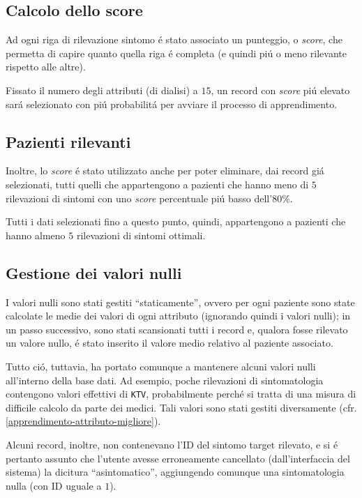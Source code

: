 \documentclass[preprint]{acm_proc_article-sp}
\begin{document}
\subsection{Calcolo dello score}
Ad ogni riga di rilevazione sintomo \'e stato associato un punteggio, o \textit{score}, che permetta di capire quanto quella riga \'e completa (e quindi pi\'u o meno rilevante rispetto alle altre).

Fissato il numero degli attributi (di dialisi) a $15$, un record con \textit{score} pi\'u elevato sar\'a selezionato con pi\'u probabilit\'a per avviare il processo di apprendimento.

\subsection{Pazienti rilevanti}
Inoltre, lo \textit{score} \'e stato utilizzato anche per poter eliminare, dai record gi\'a selezionati, tutti quelli che appartengono a pazienti che hanno meno di $5$ rilevazioni di sintomi con uno \textit{score} percentuale pi\'u basso dell'$80\%$.

Tutti i dati selezionati fino a questo punto, quindi, appartengono a pazienti che hanno almeno $5$ rilevazioni di sintomi ottimali.

\subsection{Gestione dei valori nulli}
I valori nulli sono stati gestiti ``staticamente'', ovvero per ogni paziente sono state calcolate le medie dei valori di ogni attributo (ignorando quindi i valori nulli); in un passo successivo, sono stati scansionati tutti i record e, qualora fosse rilevato un valore nullo, \'e stato inserito il valore medio relativo al paziente associato.

Tutto ci\'o, tuttavia, ha portato comunque a mantenere alcuni valori nulli all'interno della base dati. Ad esempio, poche rilevazioni di sintomatologia contengono valori effettivi di \verb|KTV|, probabilmente perch\'e si tratta di una misura di difficile calcolo da parte dei medici. Tali valori sono stati gestiti diversamente (cfr. \ref{apprendimento-attributo-migliore}).

Alcuni record, inoltre, non contenevano l'ID del sintomo target rilevato, e si \'e pertanto assunto che l'utente avesse erroneamente cancellato (dall'interfaccia del sistema) la dicitura ``asintomatico'', aggiungendo comunque una sintomatologia nulla (con ID uguale a $1$).
\end{document}
